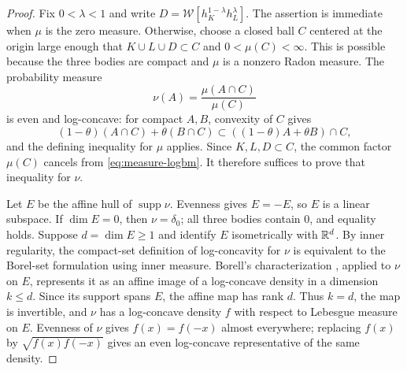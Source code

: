 \begin{proof}
Fix $0<\lambda<1$ and write
$D=\mathcal W[h_K^{1-\lambda}h_L^\lambda]$.
The assertion is immediate when $\mu$ is the zero measure. Otherwise,
choose a closed ball $C$ centered at the origin large enough that
$K\cup L\cup D\subset C$ and $0<\mu(C)<\infty$. This is possible because
the three bodies are compact and $\mu$ is a nonzero Radon measure. The
probability measure
\[
 \nu(A)=\frac{\mu(A\cap C)}{\mu(C)}
\]
is even and log-concave: for compact $A,B$, convexity of $C$ gives
\[
 (1-\theta)(A\cap C)+\theta(B\cap C)
 \subset ((1-\theta)A+\theta B)\cap C,
\]
and the defining inequality for $\mu$ applies. Since $K,L,D\subset C$,
the common factor $\mu(C)$ cancels from \eqref{eq:measure-logbm}. It
therefore suffices to prove that inequality for $\nu$.

Let $E$ be the affine hull of $\operatorname{supp}\nu$. Evenness gives
$E=-E$, so $E$ is a linear subspace. If $\dim E=0$, then
$\nu=\delta_0$; all three bodies contain $0$, and equality holds.
Suppose $d=\dim E\ge1$ and identify $E$ isometrically with $\mathbb R^d$.
By inner regularity, the compact-set definition
of log-concavity for $\nu$ is equivalent to the Borel-set formulation
using inner measure. Borell's characterization
\cite[Theorem~1.1, with $s=0$]{Borell1974}, applied to $\nu$ on $E$,
represents it as an affine image of a log-concave density in a dimension
$k\le d$. Since its support spans $E$, the affine map has rank $d$.
Thus $k=d$, the map is invertible, and $\nu$ has a log-concave density
$f$ with respect to Lebesgue measure on $E$. Evenness of $\nu$ gives
$f(x)=f(-x)$ almost everywhere; replacing $f(x)$ by
$\sqrt{f(x)f(-x)}$ gives an even log-concave representative of the same
density.


\end{proof}
